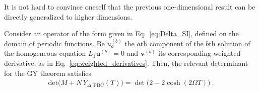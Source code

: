\documentclass[12pt,a4paper]{article}
\numberwithin{equation}{section}
\numberwithin{equation}{section}
\begin{document}
It is not hard to convince oneself that the previous one-dimensional result can be directly generalized to higher dimensions. 


\begin{theorem}\label{th:GY_periodic}
Consider an operator of the form given in Eq.~\eqref{eq:Delta_SI}, defined on the domain of periodic functions. Be $u_a^{(b)}$ the $a$th component of the $b$th solution of the homogeneous equation $L_1 \mathbf{u}^{(b)}=0$ and $\mathbf{v}^{(b)}$ its corresponding weighted derivative, as in Eq.~\eqref{eq:weighted_derivatives}. 
Then, the relevant determinant for the GY theorem satisfies
\begin{align}\label{eq:theorem}
\mathrm{det}\Big(M+N \, Y_{\Delta, \mathrm{PBC}}(T)\Big)
=\det \big(2-2\cosh(2\Omega T)\big)\ .
\end{align}
\end{theorem}
\end{document}
